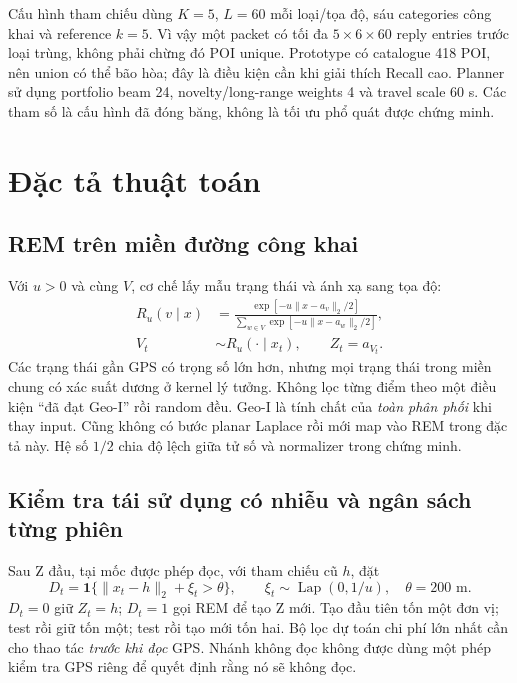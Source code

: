 Cấu hình tham chiếu dùng $K=5$, $L=60$ mỗi loại/tọa độ, sáu categories công khai và reference $k=5$.
Vì vậy một packet có tối đa $5\times6\times60$ reply entries trước loại trùng, không phải chừng đó
POI unique. Prototype có catalogue 418 POI, nên union có thể bão hòa; đây là điều kiện cần khi giải
thích Recall cao. Planner sử dụng portfolio beam 24, novelty/long-range weights 4 và travel scale
60 s. Các tham số là cấu hình đã đóng băng, không là tối ưu phổ quát được chứng minh.

\section{Đặc tả thuật toán}\label{sec:algorithm}
\subsection{REM trên miền đường công khai}
Với $u>0$ và cùng $V$, cơ chế lấy mẫu trạng thái và ánh xạ sang tọa độ:
\begin{align}
R_u(v\mid x)&=\frac{\exp[-u\|x-a_v\|_2/2]}{\sum_{w\in V}\exp[-u\|x-a_w\|_2/2]},\label{eq:rem}\\
V_t&\sim R_u(\cdot\mid x_t),\qquad Z_t=a_{V_t}.\nonumber
\end{align}
Các trạng thái gần GPS có trọng số lớn hơn, nhưng mọi trạng thái trong miền chung có xác suất dương
ở kernel lý tưởng. Không lọc từng điểm theo một điều kiện ``đã đạt Geo-I'' rồi random đều. Geo-I là
tính chất của \emph{toàn phân phối} khi thay input. Cũng không có bước planar Laplace rồi mới map vào
REM trong đặc tả này. Hệ số $1/2$ chia độ lệch giữa tử số và normalizer trong chứng minh.

\subsection{Kiểm tra tái sử dụng có nhiễu và ngân sách từng phiên}
Sau Z đầu, tại mốc được phép đọc, với tham chiếu cũ $h$, đặt
\begin{equation}
D_t=\mathbf1\{\|x_t-h\|_2+\xi_t>\theta\},\qquad
\xi_t\sim\operatorname{Lap}(0,1/u),\quad \theta=200\text{ m}.
\label{eq:private-test}
\end{equation}
$D_t=0$ giữ $Z_t=h$; $D_t=1$ gọi REM để tạo Z mới. Tạo đầu tiên tốn một đơn vị; test rồi giữ tốn
một; test rồi tạo mới tốn hai. Bộ lọc dự toán chi phí lớn nhất cần cho thao tác \emph{trước khi đọc}
GPS. Nhánh không đọc không được dùng một phép kiểm tra GPS riêng để quyết định rằng nó sẽ không đọc.

